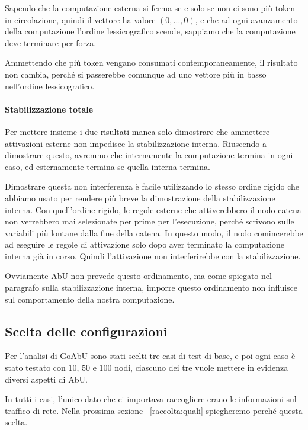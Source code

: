 \documentclass[12pt, a4paper]{article}
\begin{document}
Sapendo che la computazione esterna si ferma se e solo se non ci sono più token in circolazione, quindi il vettore ha valore $(0,...,0)$, e che ad ogni avanzamento della computazione l'ordine lessicografico scende, sappiamo che la computazione deve terminare per forza.

Ammettendo che più token vengano consumati contemporaneamente, il risultato non cambia, perché si passerebbe comunque ad uno vettore più in basso nell'ordine lessicografico.

\paragraph{Stabilizzazione totale}

Per mettere insieme i due risultati manca solo dimostrare che ammettere attivazioni esterne non impedisce la stabilizzazione interna. Riuscendo a dimostrare questo, avremmo che internamente la computazione termina in ogni caso, ed esternamente termina se quella interna termina.

Dimostrare questa non interferenza è facile utilizzando lo stesso ordine rigido che abbiamo usato per rendere più breve la dimostrazione della stabilizzazione interna. Con quell'ordine rigido, le regole esterne che attiverebbero il nodo catena non verrebbero mai selezionate per prime per l'esecuzione, perché scrivono sulle variabili più lontane dalla fine della catena.
In questo modo, il nodo comincerebbe ad eseguire le regole di attivazione solo dopo aver terminato la computazione interna già in corso. Quindi l'attivazione non interferirebbe con la stabilizzazione.

Ovviamente AbU non prevede questo ordinamento, ma come spiegato nel paragrafo sulla stabilizzazione interna, imporre questo ordinamento non influisce sul comportamento della nostra computazione.

\subsection{Scelta delle configurazioni}

Per l'analisi di GoAbU sono stati scelti tre casi di test di base, e poi ogni caso è stato testato con $10$, $50$ e $100$ nodi, ciascuno dei tre vuole mettere in evidenza diversi aspetti di AbU.

In tutti i casi, l'unico dato che ci importava raccogliere erano le informazioni sul traffico di rete. Nella prossima sezione ~\ref{raccolta:quali} spiegheremo perché questa scelta.
\end{document}
